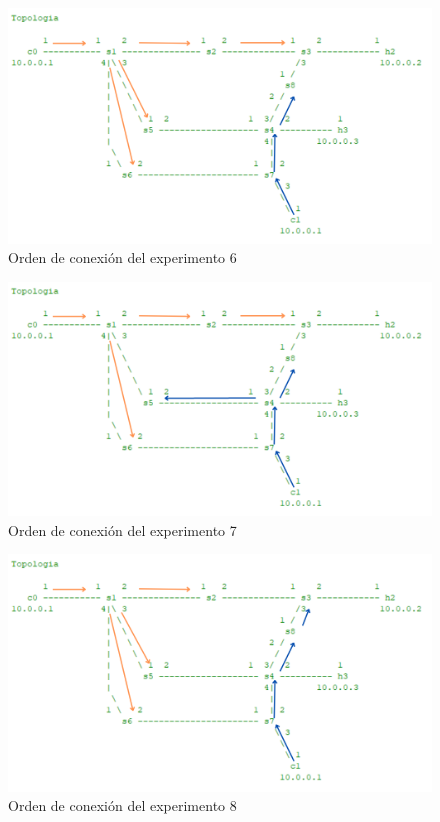 \documentclass[a4paper, 12pt]{book}
\begin{document}
	\begin{figure}
		\centering
		\includegraphics[width=16cm, keepaspectratio]{img/escenario1_2c_5}
		\caption{Orden de conexión del experimento 6}
		\label{figura:escenario1_2c_5}
	\end{figure}
	
	\begin{figure}
		\centering
		\includegraphics[width=16cm, keepaspectratio]{img/escenario1_2c_6}
		\caption{Orden de conexión del experimento 7}
		\label{figura:escenario1_2c_6}
	\end{figure}
	
	\begin{figure}
		\centering
		\includegraphics[width=16cm, keepaspectratio]{img/escenario1_2c_7}
		\caption{Orden de conexión del experimento 8}
		\label{figura:escenario1_2c_7}
	\end{figure}
	
\end{document}
